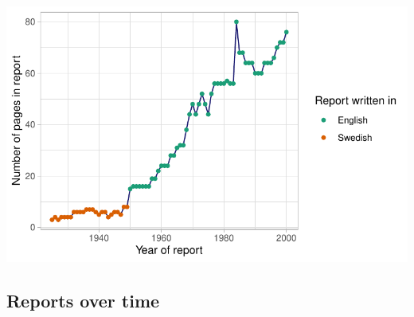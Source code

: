 \documentclass[
  letterpaper,
  DIV=11,
  numbers=noendperiod]{scrartcl}
\begin{document}
\includegraphics{index_files/figure-pdf/unnamed-chunk-1-1.pdf}

\hypertarget{reports-over-time}{%
\subsection{Reports over time}\label{reports-over-time}}
\end{document}
